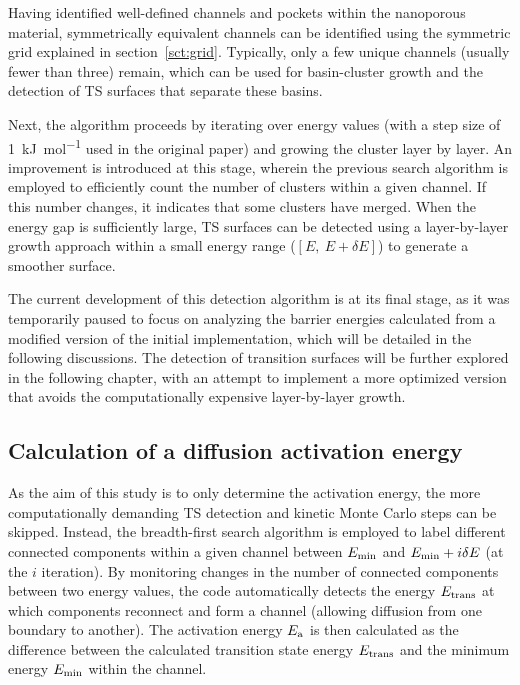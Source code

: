 \documentclass[main]{subfiles}
\begin{document}
Having identified well-defined channels and pockets within the nanoporous material, symmetrically equivalent channels can be identified using the symmetric grid explained in section~\ref{sct:grid}. Typically, only a few unique channels (usually fewer than three) remain, which can be used for basin-cluster growth and the detection of TS surfaces that separate these basins.

Next, the algorithm proceeds by iterating over energy values (with a step size of \SI{1}{\kJ\per\mole} used in the original paper) and growing the cluster layer by layer. An improvement is introduced at this stage, wherein the previous search algorithm is employed to efficiently count the number of clusters within a given channel. If this number changes, it indicates that some clusters have merged. When the energy gap is sufficiently large, TS surfaces can be detected using a layer-by-layer growth approach within a small energy range ($[E,\ E+\delta E]$) to generate a smoother surface.

The current development of this detection algorithm is at its final stage, as it was temporarily paused to focus on analyzing the barrier energies calculated from a modified version of the initial implementation, which will be detailed in the following discussions. The detection of transition surfaces will be further explored in the following chapter, with an attempt to implement a more optimized version that avoids the computationally expensive layer-by-layer growth.

\subsection{Calculation of a diffusion activation energy}

As the aim of this study is to only determine the activation energy, the more computationally demanding TS detection and kinetic Monte Carlo steps can be skipped. Instead, the breadth-first search algorithm is employed to label different connected components within a given channel between $E_{\text{min}}$ and $E_{\text{min}}+i\delta E$ (at the $i$ iteration). By monitoring changes in the number of connected components between two energy values, the code automatically detects the energy $E_{\text{trans}}$ at which components reconnect and form a channel (allowing diffusion from one boundary to another). The activation energy $E_{\text{a}}$ is then calculated as the difference between the calculated transition state energy $E_{\text{trans}}$ and the minimum energy $E_{\text{min}}$ within the channel.
\end{document}

